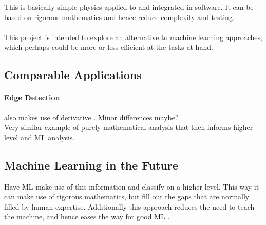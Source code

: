 \documentclass[main.tex]{subfiles}
\begin{document}
    This is basically simple physics applied to and integrated in software. It can be based on rigorous mathematics and hence reduce complexity and testing.
    \\\\
    This project is intended to explore an alternative to machine learning approaches, which perhaps could be more or less efficient at the tasks at hand. 
    
    \subsection{Comparable Applications}
    
    \paragraph{Edge Detection} also makes use of derivative \cite{}. Minor differences maybe? \\
    Very similar example of purely mathematical analysis that then informs higher level and ML analysis.
    
    \subsection{Machine Learning in the Future}
    
    Have ML make use of this information and classify on a higher level. This way it can make use of rigorous mathematics, but fill out the gaps that are normally filled by human expertise. Additionally this approach reduces the need to teach the machine, and hence eases the way for good ML \cite{}.
    
\end{document}
